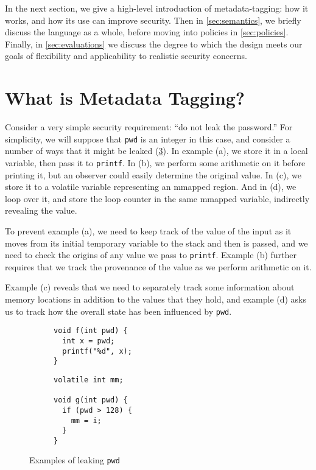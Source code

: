 \documentclass{llncs}
\begin{document}
In the next section, we give a high-level introduction of metadata-tagging: how it works,
and how its use can improve security. Then in \cref{sec:semantics}, we briefly discuss the
language as a whole, before moving into policies in \cref{sec:policies}. Finally, in
\cref{sec:evaluations} we discuss the degree to
which the design meets our goals of flexibility and applicability to realistic
security concerns.

\section{What is Metadata Tagging?}
  
Consider a very simple security requirement: ``do not leak the password.''
For simplicity, we will suppose that {\tt pwd} is an integer in this case, and consider
a number of ways that it might be leaked (\cref{fig:exampleleak}).
In example (a), we store it in a local variable, then pass it to {\tt printf}.
In (b), we perform some arithmetic on it before printing it, but an observer could
easily determine the original value. In (c), we store it to a volatile variable
representing an mmapped region. And in (d), we loop over it, and store the loop
counter in the same mmapped variable, indirectly revealing the value.

To prevent example (a), we need to keep track of the value of the input as it
moves from its initial temporary variable to the stack and then is passed, and
we need to check the origins of any value we pass to {\tt printf}. Example (b)
further requires that we track the provenance of the value as we perform arithmetic
on it.

Example (c) reveals that we need to separately track some information about memory
locations in addition to the values that they hold, and example (d) asks us to track
how the overall state has been influenced by {\tt pwd}.


\begin{figure}
  \begin{subfigure}[t]{0.49\textwidth}
\begin{verbatim}
void f(int pwd) {
  int x = pwd;
  printf("%d", x);
}
\end{verbatim}
\caption{}
\label{fig:ex1}
  \end{subfigure}  
  \begin{subfigure}[t]{0.49\textwidth}
\begin{verbatim}
volatile int mm;

void g(int pwd) {
  if (pwd > 128) {
    mm = i;
  }
}
\end{verbatim}
\caption{}
\label{fig:ex2}
  \end{subfigure}

  \caption{Examples of leaking {\tt pwd}}
  \label{fig:exampleleak}
\end{figure}
\end{document}
